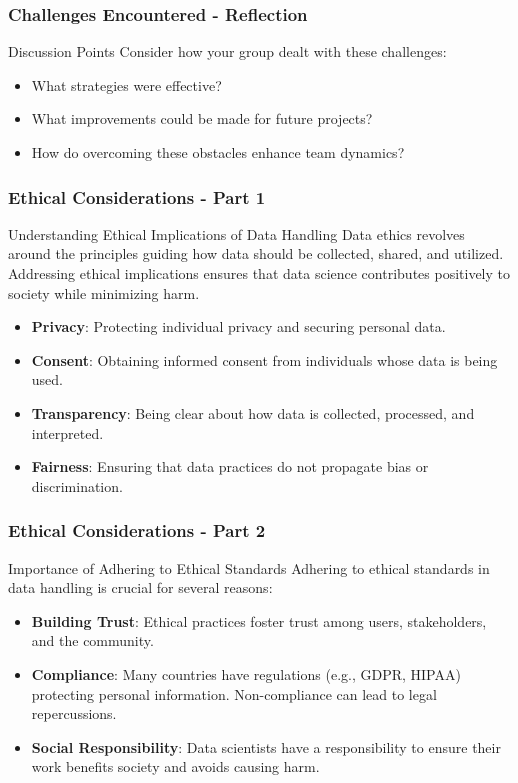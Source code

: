 \documentclass[aspectratio=169]{beamer}
\begin{document}
\begin{frame}[fragile]
  \frametitle{Challenges Encountered - Reflection}
  \begin{block}{Discussion Points}
    Consider how your group dealt with these challenges:
    \begin{itemize}
      \item What strategies were effective?
      \item What improvements could be made for future projects?
      \item How do overcoming these obstacles enhance team dynamics?
    \end{itemize}
  \end{block}
\end{frame}

\begin{frame}[fragile]
    \frametitle{Ethical Considerations - Part 1}
    \begin{block}{Understanding Ethical Implications of Data Handling}
        Data ethics revolves around the principles guiding how data should be collected, shared, and utilized. Addressing ethical implications ensures that data science contributes positively to society while minimizing harm.
    \end{block}

    \begin{itemize}
        \item \textbf{Privacy}: Protecting individual privacy and securing personal data.
        \item \textbf{Consent}: Obtaining informed consent from individuals whose data is being used.
        \item \textbf{Transparency}: Being clear about how data is collected, processed, and interpreted.
        \item \textbf{Fairness}: Ensuring that data practices do not propagate bias or discrimination.
    \end{itemize}
\end{frame}

\begin{frame}[fragile]
    \frametitle{Ethical Considerations - Part 2}
    \begin{block}{Importance of Adhering to Ethical Standards}
        Adhering to ethical standards in data handling is crucial for several reasons:
    \end{block}

    \begin{itemize}
        \item \textbf{Building Trust}: Ethical practices foster trust among users, stakeholders, and the community.
        \item \textbf{Compliance}: Many countries have regulations (e.g., GDPR, HIPAA) protecting personal information. Non-compliance can lead to legal repercussions.
        \item \textbf{Social Responsibility}: Data scientists have a responsibility to ensure their work benefits society and avoids causing harm.
    \end{itemize}
\end{frame}
\end{document}
